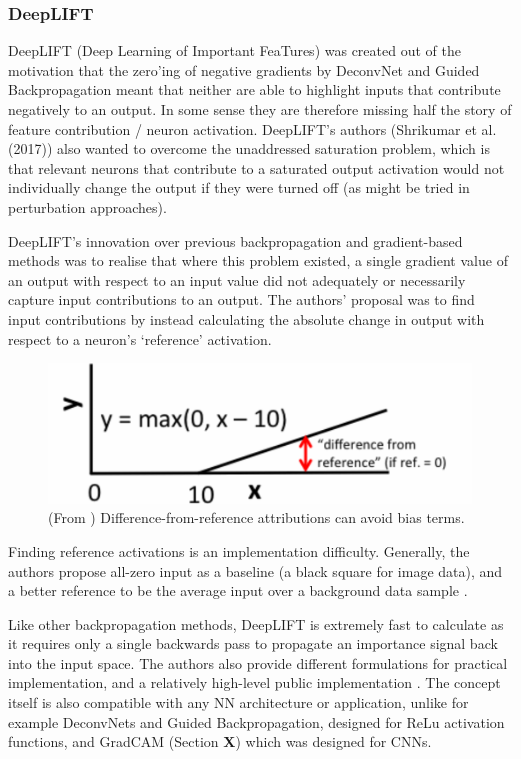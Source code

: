 \documentclass[main]{subfiles}
\begin{document}
\subsubsection{DeepLIFT}

DeepLIFT (Deep Learning of Important FeaTures) \cite{deeplift} was created out of the motivation that the zero'ing of negative gradients by DeconvNet and Guided Backpropagation meant that neither are able to highlight inputs that contribute negatively to an output. In some sense they are therefore missing half the story of feature contribution / neuron activation. DeepLIFT's authors (Shrikumar et al. (2017)) also wanted to overcome the unaddressed saturation problem, which is that relevant neurons that contribute to a saturated output activation would not individually change the output if they were turned off (as might be tried in perturbation approaches).

DeepLIFT's innovation over previous backpropagation and gradient-based methods was to realise that where this problem existed, a single gradient value of an output with respect to an input value did not adequately or necessarily capture input contributions to an output. The authors' proposal was to find input contributions by instead calculating the absolute change in output with respect to a neuron's `reference' activation. 

\begin{figure}[h]
\centering
\includegraphics[scale=0.3]{deeplift.png}
\caption{(From \cite{deeplift}) Difference-from-reference attributions can avoid bias terms.}
\label{deepliftimg}
\end{figure}

Finding reference activations is an implementation difficulty. Generally, the authors propose all-zero input as a baseline (a black square for image data), and a better reference to be the average input over a background data sample \cite{deeplift}.

Like other backpropagation methods, DeepLIFT is extremely fast to calculate as it requires only a single backwards pass to propagate an importance signal back into the input space. The authors also provide different formulations for practical implementation, and a relatively high-level public implementation \cite{deepliftrepo}. The concept itself is also compatible with any NN architecture or application, unlike for example DeconvNets and Guided Backpropagation, designed for ReLu activation functions, and GradCAM (Section \textbf{X}) which was designed for CNNs.
\end{document}
